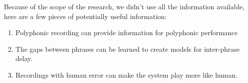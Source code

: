 

Because of the scope of the research, we didn't use all the information available, here are a few pieces of potentially useful information:
\begin{enumerate}
   \item Polyphonic recording can provide information for polyphonic performance
   \item The gaps between phrases can be learned to create models for inter-phrase delay.
   \item Recordings with human error can make the system play more like human.
\end{enumerate}
